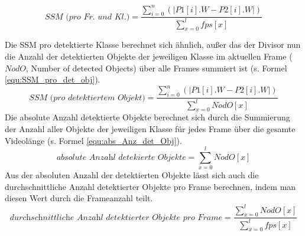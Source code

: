 {	\begin{equation} \label{equ:SSM_p_fr_u_kl}
		\textit{SSM (pro Fr. und Kl.)} = \frac{\sum_{i = 0}^{n}  (\lvert P1[i].W - P2[i].W\rvert) }{ \sum_{x=0}^{l} \textit{fps}[x]}
	\end{equation}

	Die SSM pro detektierte Klasse berechnet sich ähnlich, außer das der Divisor nun die Anzahl der detektierten Objekte der jeweiligen Klasse im aktuellen Frame ($\textit{NodO}$, \glqq Number of detected Objects\grqq{}) über alle Frames summiert ist (s. Formel \ref{equ:SSM_pro_det_obj}).	 
	\begin{equation} \label{equ:SSM_pro_det_obj}
		\textit{SSM (pro detektiertem Objekt)} = \frac{\sum_{i = 0}^{n}  (\lvert P1[i].W - P2[i].W\rvert) }{ \sum_{x=0}^{l} \textit{NodO}[x]}
	\end{equation} 
	Die absolute Anzahl detektierte Objekte berechnet sich durch die Summierung der Anzahl aller Objekte der jeweiligen Klasse für jedes Frame über die gesamte Videolänge (s. Formel \ref{equ:abs_Anz_det_Obj}). 
	\begin{equation} \label{equ:abs_Anz_det_Obj}
		\textit{absolute Anzahl detekierte Objekte} = { \sum_{x=0}^{l} \textit{NodO}[x]}
	\end{equation}
	Aus der absoluten Anzahl der detektierten Objekte lässt sich auch die durchschnittliche Anzahl detektierter Objekte pro Frame berechnen, indem man diesen Wert durch die Frameanzahl teilt.
	\begin{equation}
		\textit{durchschnittliche Anzahl detektierter Objekte pro Frame} = \frac{\sum_{x=0}^{l} \textit{NodO}[x]}{\sum_{x=0}^{l} \textit{fps}[x]} 
	\end{equation}

	
}